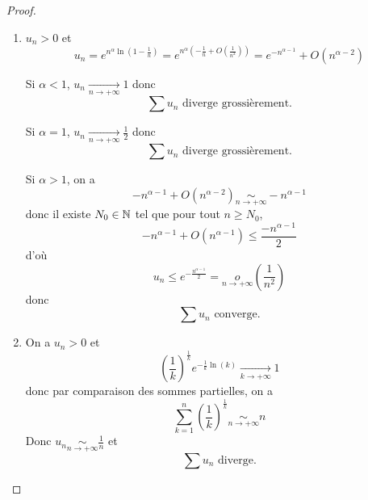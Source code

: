 \begin{proof}
	\phantom{}
	\begin{enumerate}
		\item $u_{n}>0$ et 
		\begin{equation}u_{n}=e^{n^{\alpha}\ln\left(1-\frac{1}{n}\right)}=e^{n^{\alpha}\left(-\frac{1}{n}+O\left(\frac{1}{n^{2}}\right)\right)}=e^{-n^{\alpha-1}}+O\left(n^{\alpha-2}\right)\end{equation}

		Si $\alpha<1$, $u_{n}\xrightarrow[n\to+\infty]{}1$ donc 
		\begin{equation}\boxed{\sum u_{n}\text{ diverge grossièrement.}}\end{equation}

		Si $\alpha=1$, $u_{n}\xrightarrow[n\to+\infty]{}\frac{1}{2}$ donc 
		\begin{equation}\boxed{\sum u_{n}\text{ diverge grossièrement.}}\end{equation}

		Si $\alpha>1$, on a 
		\begin{equation}-n^{\alpha-1}+O\left(n^{\alpha-2}\right)\underset{n\to+\infty}{\sim}-n^{\alpha-1}\end{equation}
		donc il existe $N_{0}\in\mathbb{N}$ tel que pour tout $n\geqslant N_{0}$,
		\begin{equation}-n^{\alpha-1}+O\left(n^{\alpha-1}\right)\leqslant\frac{-n^{\alpha-1}}{2}\end{equation}
		d'où 
		\begin{equation}u_{n}\leqslant e^{-\frac{n^{\alpha-1}}{2}}=\underset{n\to+\infty}{o}\left(\frac{1}{n^{2}}\right)\end{equation}
		donc 
		\begin{equation}\boxed{\sum u_{n}\text{ converge.}}\end{equation}

		\item On a $u_{n}>0$ et 
		\begin{equation}\left(\frac{1}{k}\right)^{\frac{1}{k}}e^{-\frac{1}{k}\ln(k)}\xrightarrow[k\to+\infty]{}1\end{equation}
		donc par comparaison des sommes partielles, on a 
		\begin{equation}\sum_{k=1}^{n}\left(\frac{1}{k}\right)^{\frac{1}{k}}\underset{n\to+\infty}{\sim}n\end{equation}
		Donc $u_{n}\underset{n\to+\infty}{\sim}\frac{1}{n}$ et 
		\begin{equation}\boxed{\sum u_{n}\text{ diverge.}}\end{equation}


\end{enumerate}
\end{proof}
